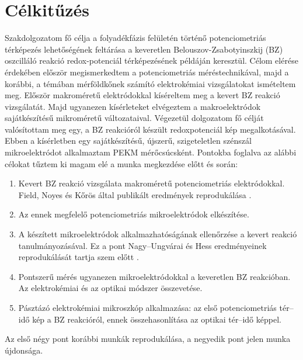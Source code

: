 \chapter{Célkitűzés} \label{celkituzes}
\pagestyle{headings}

Szakdolgozatom fő célja a folyadékfázis felületén történő potenciometriás térképezés lehetőségének feltárása a keveretlen Belouszov-Zsabotyinszkij (BZ) oszcilláló reakció redox-potenciál térképezésének példáján keresztül. Célom elérése érdekében először megismerkedtem a potenciometriás méréstechnikával, majd a korábbi, a témában mérföldkőnek számító elektrokémiai vizsgálatokat ismételtem meg. Először makroméretű elektródokkal kíséreltem meg a kevert BZ reakció vizsgálatát. Majd ugyanezen kísérleteket elvégeztem a makroelektródok sajátkészítésű mikroméretű változataival. Végezetül dolgozatom fő célját valósítottam meg egy, a BZ reakcióról készült redoxpotenciál kép megalkotásával. Ebben a kísérletben egy sajátkészítésű, újszerű, szigeteletlen szénszál mikroelektródot alkalmaztam PEKM mérőcsúcsként. Pontokba foglalva az alábbi célokat tűztem ki magam elé a munka megkezdése előtt és során:

\begin{enumerate}
\item Kevert BZ reakció vizsgálata makroméretű potenciometriás elektródokkal. Field, Noyes és Kőrös által publikált eredmények reprodukálása \cite{noyes1972oscillations}. 
\item Az ennek megfelelő potenciometriás mikroelektródok elkészítése.
\item A készített mikroelektródok alkalmazhatóságának ellenőrzése a kevert reakció tanulmányozásával. Ez a pont Nagy--Ungvárai és Hess eredményeinek reprodukálását tartja szem előtt \cite{nagy1991control}. 
\item Pontszerű mérés ugyanezen mikroelektródokkal a keveretlen BZ reakcióban. Az elektrokémiai és az optikai módszer összevetése.
\item Pásztázó elektrokémiai mikroszkóp alkalmazása: az első potenciometriás tér--idő kép a BZ reakcióról, ennek összehasonlítása az optikai tér--idő képpel.
\end{enumerate}

Az első négy pont korábbi munkák reprodukálása, a negyedik pont jelen munka újdonsága. 

